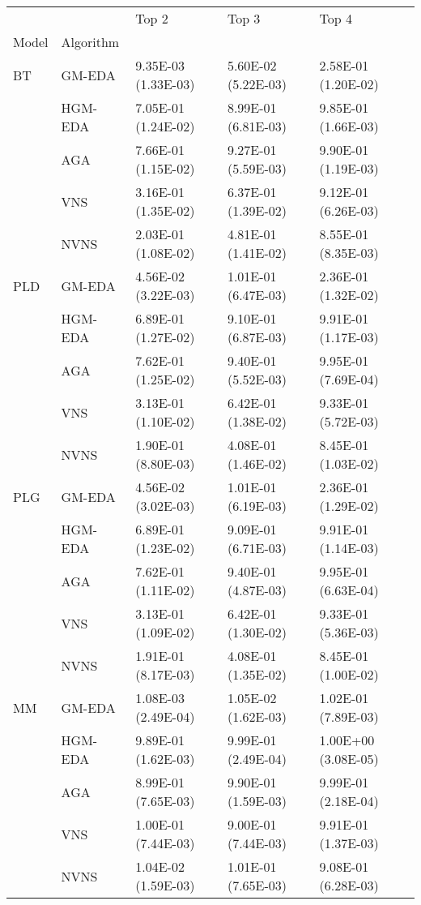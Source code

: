 \begin{tabular}{lllll}
\toprule
   &      &                Top 2 &                Top 3 &                Top 4 \\
Model & Algorithm &                      &                      &                      \\
\midrule
BT & GM-EDA &  9.35E-03 (1.33E-03) &  5.60E-02 (5.22E-03) &  2.58E-01 (1.20E-02) \\
   & HGM-EDA &  7.05E-01 (1.24E-02) &  8.99E-01 (6.81E-03) &  9.85E-01 (1.66E-03) \\
   & AGA &  7.66E-01 (1.15E-02) &  9.27E-01 (5.59E-03) &  9.90E-01 (1.19E-03) \\
   & VNS &  3.16E-01 (1.35E-02) &  6.37E-01 (1.39E-02) &  9.12E-01 (6.26E-03) \\
   & NVNS &  2.03E-01 (1.08E-02) &  4.81E-01 (1.41E-02) &  8.55E-01 (8.35E-03) \\
PLD & GM-EDA &  4.56E-02 (3.22E-03) &  1.01E-01 (6.47E-03) &  2.36E-01 (1.32E-02) \\
   & HGM-EDA &  6.89E-01 (1.27E-02) &  9.10E-01 (6.87E-03) &  9.91E-01 (1.17E-03) \\
   & AGA &  7.62E-01 (1.25E-02) &  9.40E-01 (5.52E-03) &  9.95E-01 (7.69E-04) \\
   & VNS &  3.13E-01 (1.10E-02) &  6.42E-01 (1.38E-02) &  9.33E-01 (5.72E-03) \\
   & NVNS &  1.90E-01 (8.80E-03) &  4.08E-01 (1.46E-02) &  8.45E-01 (1.03E-02) \\
PLG & GM-EDA &  4.56E-02 (3.02E-03) &  1.01E-01 (6.19E-03) &  2.36E-01 (1.29E-02) \\
   & HGM-EDA &  6.89E-01 (1.23E-02) &  9.09E-01 (6.71E-03) &  9.91E-01 (1.14E-03) \\
   & AGA &  7.62E-01 (1.11E-02) &  9.40E-01 (4.87E-03) &  9.95E-01 (6.63E-04) \\
   & VNS &  3.13E-01 (1.09E-02) &  6.42E-01 (1.30E-02) &  9.33E-01 (5.36E-03) \\
   & NVNS &  1.91E-01 (8.17E-03) &  4.08E-01 (1.35E-02) &  8.45E-01 (1.00E-02) \\
MM & GM-EDA &  1.08E-03 (2.49E-04) &  1.05E-02 (1.62E-03) &  1.02E-01 (7.89E-03) \\
   & HGM-EDA &  9.89E-01 (1.62E-03) &  9.99E-01 (2.49E-04) &  1.00E+00 (3.08E-05) \\
   & AGA &  8.99E-01 (7.65E-03) &  9.90E-01 (1.59E-03) &  9.99E-01 (2.18E-04) \\
   & VNS &  1.00E-01 (7.44E-03) &  9.00E-01 (7.44E-03) &  9.91E-01 (1.37E-03) \\
   & NVNS &  1.04E-02 (1.59E-03) &  1.01E-01 (7.65E-03) &  9.08E-01 (6.28E-03) \\
\bottomrule
\end{tabular}
